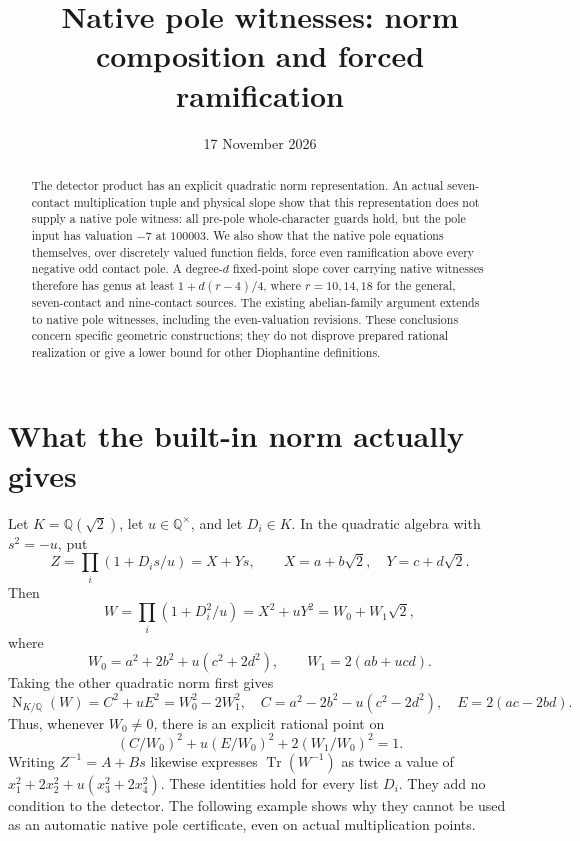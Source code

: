 \documentclass[11pt,a4paper]{article}
\title{Native pole witnesses: norm composition and forced ramification}
\author{}\date{17 November 2026}
\newcommand{\Q}{\mathbb Q}\newcommand{\Z}{\mathbb Z}
\newcommand{\Tr}{\operatorname{Tr}}\newcommand{\Nm}{\operatorname{N}}
\begin{document}
\maketitle
\begin{abstract}
The detector product has an explicit quadratic norm representation.
An actual seven-contact multiplication tuple and physical slope show that
this representation does not supply a native pole witness: all pre-pole
whole-character guards hold, but the pole input has valuation $-7$ at
$100003$. We also show that the native pole equations themselves, over
discretely valued function fields, force even ramification above every
negative odd contact pole. A degree-$d$ fixed-point slope cover carrying
native witnesses therefore has genus at least $1+d(r-4)/4$, where
$r=10,14,18$ for the general, seven-contact and nine-contact sources.
The existing abelian-family argument extends to native pole witnesses,
including the even-valuation revisions. These conclusions concern
specific geometric constructions; they do not disprove prepared rational
realization or give a lower bound for other Diophantine definitions.
\end{abstract}

\section{What the built-in norm actually gives}
Let $K=\Q(\sqrt2)$, let $u\in\Q^\times$, and let $D_i\in K$.
In the quadratic algebra with $s^2=-u$, put
\[
 Z=\prod_i(1+D_i s/u)=X+Ys,
 \qquad X=a+b\sqrt2,\quad Y=c+d\sqrt2.
\]
Then
\begin{equation}\label{eq:norm}
 W=\prod_i(1+D_i^2/u)=X^2+uY^2=W_0+W_1\sqrt2,
\end{equation}
where
\[
 W_0=a^2+2b^2+u(c^2+2d^2),\qquad W_1=2(ab+ucd).
\]
Taking the other quadratic norm first gives
\begin{equation}\label{eq:cross}
 \Nm_{K/\Q}(W)=C^2+uE^2=W_0^2-2W_1^2,
 \quad C=a^2-2b^2-u(c^2-2d^2),\quad E=2(ac-2bd).
\end{equation}
Thus, whenever $W_0\ne0$, there is an explicit rational point on
\[
              (C/W_0)^2+u(E/W_0)^2+2(W_1/W_0)^2=1.
\]
Writing $Z^{-1}=A+Bs$ likewise expresses
$\Tr(W^{-1})$ as twice a value of
$x_1^2+2x_2^2+u(x_3^2+2x_4^2)$.
These identities hold for every list $D_i$. They add no condition to
the detector. The following example shows why they cannot be used as
an automatic native pole certificate, even on actual multiplication points.
\end{document}
